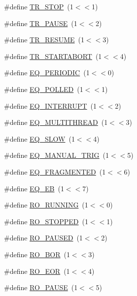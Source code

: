\begin{DoxyCompactItemize}
\#define \hyperlink{group__mdefineh_gadd7d0605113ff6e1b4e705d31332a1a0}{TR\_\-STOP}~(1$<$$<$1)
\item 
\#define \hyperlink{group__mdefineh_ga11713399cfb35e58b8fae045836c0d88}{TR\_\-PAUSE}~(1$<$$<$2)
\item 
\#define \hyperlink{group__mdefineh_ga0b69b728877f100fe6ff76e667ff8831}{TR\_\-RESUME}~(1$<$$<$3)
\item 
\#define \hyperlink{group__mdefineh_ga61faff4d81f378438500ef8971e2b7af}{TR\_\-STARTABORT}~(1$<$$<$4)
\item 
\#define \hyperlink{group__mdefineh_ga58e919e4e401b299c1834be965c3e78c}{EQ\_\-PERIODIC}~(1$<$$<$0)
\item 
\#define \hyperlink{group__mdefineh_ga0c716a0a98b5da8bbe8477839d9b0c78}{EQ\_\-POLLED}~(1$<$$<$1)
\item 
\#define \hyperlink{group__mdefineh_gad5ba2ec0f5d55139048dbe2d416da6ba}{EQ\_\-INTERRUPT}~(1$<$$<$2)
\item 
\#define \hyperlink{group__mdefineh_ga7cc85959e8d0c4e476cf659c2cee7a33}{EQ\_\-MULTITHREAD}~(1$<$$<$3)
\item 
\#define \hyperlink{group__mdefineh_gafffdc5135b2e8f3c6bc61b8701084df6}{EQ\_\-SLOW}~(1$<$$<$4)
\item 
\#define \hyperlink{group__mdefineh_gac73e1045dff2b724325100af2e946717}{EQ\_\-MANUAL\_\-TRIG}~(1$<$$<$5)
\item 
\#define \hyperlink{group__mdefineh_ga702ba5dcc4b9f1ccf9a1a37bad62266e}{EQ\_\-FRAGMENTED}~(1$<$$<$6)
\item 
\#define \hyperlink{group__mdefineh_ga28055cb167765a3f23ac9ef55afb8e26}{EQ\_\-EB}~(1$<$$<$7)
\item 
\#define \hyperlink{group__mdefineh_gafc5ef41cae398b8500f9c3a42cef6d2c}{RO\_\-RUNNING}~(1$<$$<$0)
\item 
\#define \hyperlink{group__mdefineh_ga05a5abc619ab24e168695befc7c0b4be}{RO\_\-STOPPED}~(1$<$$<$1)
\item 
\#define \hyperlink{group__mdefineh_ga8a47b3b86a72a7db84a582277d4b7a39}{RO\_\-PAUSED}~(1$<$$<$2)
\item 
\#define \hyperlink{group__mdefineh_ga88e94e1aadd86417c8eaa304d8c3b467}{RO\_\-BOR}~(1$<$$<$3)
\item 
\#define \hyperlink{group__mdefineh_ga5b505930aa1fc780118b4fc75f771464}{RO\_\-EOR}~(1$<$$<$4)
\item 
\#define \hyperlink{group__mdefineh_ga55beb931c834300fea83d24014f235d8}{RO\_\-PAUSE}~(1$<$$<$5)
\item 

\end{DoxyCompactItemize}
